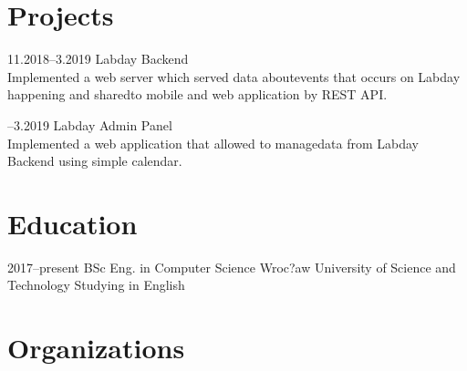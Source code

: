 \documentclass[]{cv-style}
\begin{document}
\section{Projects}

\begin{entrylist}
\entry
  {11.2018--3.2019}
  { Labday Backend}
  {}
  {\\
  Implemented a web server which served data about\newline events that occurs on Labday happening and shared\newline to mobile and web application by REST API.}

\entry
  {\newline{}--3.2019  }
  { Labday Admin Panel}
  {}
  {\\
  Implemented a web application that allowed to manage\newline data from Labday Backend using simple calendar.}
  {\vspace{-0.3cm}}
\end{entrylist}


\section{Education}

\begin{entrylist}
\entry
{2017--present\quad }
{ BSc Eng. {\normalfont  in Computer Science}}
{Wroc?aw University of Science and Technology}
{ Studying in English}
{\vspace{0.3cm}}
\end{entrylist}


\section{Organizations}
\end{document}
